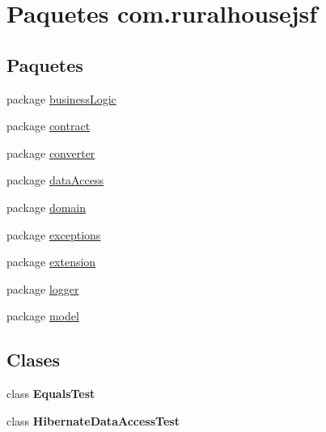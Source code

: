 \hypertarget{namespacecom_1_1ruralhousejsf}{}\section{Paquetes com.\+ruralhousejsf}
\label{namespacecom_1_1ruralhousejsf}
\subsection*{Paquetes}
\begin{DoxyCompactItemize}
\item 
package \mbox{\hyperlink{namespacecom_1_1ruralhousejsf_1_1business_logic}{business\+Logic}}
\item 
package \mbox{\hyperlink{namespacecom_1_1ruralhousejsf_1_1contract}{contract}}
\item 
package \mbox{\hyperlink{namespacecom_1_1ruralhousejsf_1_1converter}{converter}}
\item 
package \mbox{\hyperlink{namespacecom_1_1ruralhousejsf_1_1data_access}{data\+Access}}
\item 
package \mbox{\hyperlink{namespacecom_1_1ruralhousejsf_1_1domain}{domain}}
\item 
package \mbox{\hyperlink{namespacecom_1_1ruralhousejsf_1_1exceptions}{exceptions}}
\item 
package \mbox{\hyperlink{namespacecom_1_1ruralhousejsf_1_1extension}{extension}}
\item 
package \mbox{\hyperlink{namespacecom_1_1ruralhousejsf_1_1logger}{logger}}
\item 
package \mbox{\hyperlink{namespacecom_1_1ruralhousejsf_1_1model}{model}}
\end{DoxyCompactItemize}
\subsection*{Clases}
\begin{DoxyCompactItemize}
\item 
class {\bfseries Equals\+Test}
\item 
class {\bfseries Hibernate\+Data\+Access\+Test}
\end{DoxyCompactItemize}
